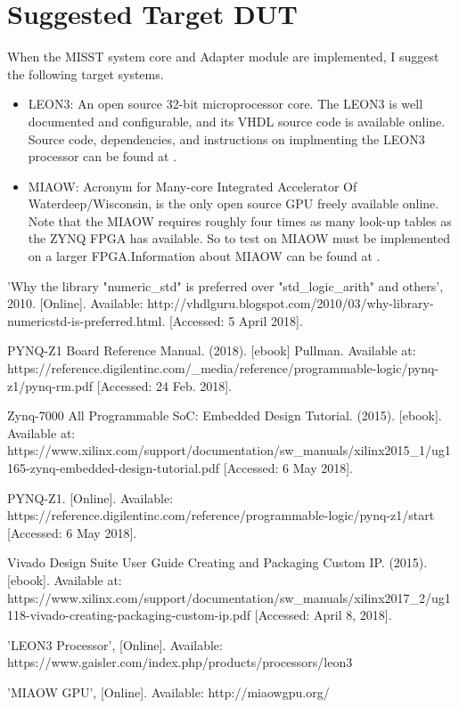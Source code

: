 \documentclass[]{report}
\begin{document}
\section{Suggested Target DUT}

When the MISST system core and Adapter module are implemented, I suggest the following target systems.
\begin{itemize}
	\item LEON3: An open source 32-bit microprocessor core. The LEON3 is well documented and configurable, and its VHDL source code is available online. Source code, dependencies, and instructions on implmenting the LEON3 processor can be found at \cite{leon3}.
	\item MIAOW: Acronym for Many-core Integrated Accelerator Of Waterdeep/Wisconsin, is the only open source GPU freely available online. Note that the MIAOW requires roughly four times as many look-up tables as the ZYNQ FPGA has available. So to test on MIAOW must be implemented on a larger FPGA.Information about MIAOW can be found at \cite{meow gpu}.
\end{itemize}

\begin{thebibliography}{5}
	 'Why the library "numeric\_std" is preferred over "std\_logic\_arith" and others', 2010. [Online]. Available: http://vhdlguru.blogspot.com/2010/03/why-library-numericstd-is-preferred.html. [Accessed: 5 April 2018].
	
	PYNQ-Z1 Board Reference Manual. (2018). [ebook] Pullman. Available at: https://reference.digilentinc.com/\_media/reference/programmable-logic/pynq-z1/pynq-rm.pdf [Accessed: 24 Feb. 2018].
	
	Zynq-7000 All Programmable SoC: Embedded Design Tutorial. (2015). [ebook]. Available at: https://www.xilinx.com/support/documentation/sw\_manuals/xilinx2015\_1/ug1165-zynq-embedded-design-tutorial.pdf [Accessed: 6 May 2018].
	
	 PYNQ-Z1. [Online]. Available: https://reference.digilentinc.com/reference/programmable-logic/pynq-z1/start [Accessed: 6 May 2018].
	
	 Vivado Design Suite User Guide Creating and Packaging Custom IP. (2015). [ebook]. Available at: https://www.xilinx.com/support/documentation/sw\_manuals/xilinx2017\_2/ug1118-vivado-creating-packaging-custom-ip.pdf [Accessed: April 8, 2018].
	
	 'LEON3 Processor', [Online]. Available: https://www.gaisler.com/index.php/products/processors/leon3
	
	 'MIAOW GPU', [Online]. Available: http://miaowgpu.org/
	
\end{thebibliography}
\end{document}
